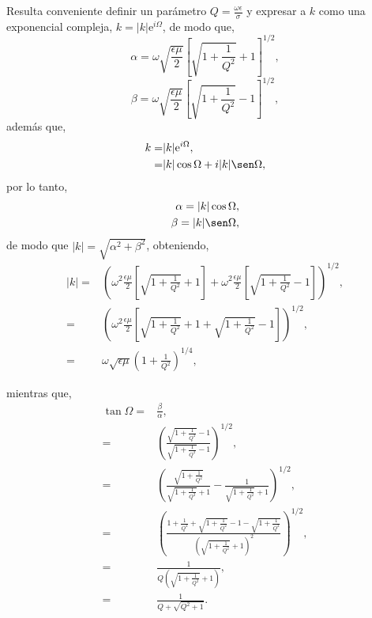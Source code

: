 \documentclass[11pt,fleqn]{book} %
\begin{document}
Resulta conveniente definir un par\'ametro $Q=\frac{\omega\epsilon}{\sigma}$ y expresar a $k$ como una exponencial compleja, $k=|k|\text{e}^{i\Omega}$, de modo que,
\begin{equation}
\alpha=\omega\sqrt{\frac{\epsilon\mu}{2}}\left[ \sqrt{1+\frac{1}{Q^2}}+1 \right]^{1/2},
\end{equation}
 \begin{equation}
 \beta=\omega\sqrt{\frac{\epsilon\mu}{2}}\left[ \sqrt{1+\frac{1}{Q^2}}-1 \right]^{1/2},
 \end{equation}
adem\'as que,
\begin{equation*}
\begin{split}
k=&|k|\text{e}^{i\Omega},\\
=&|k|\cos \Omega+i|k|\sen \Omega,
\end{split}
\end{equation*}
por lo tanto,
\begin{equation*}
\begin{split}
\alpha=|k|\cos \Omega,\\
\beta=|k|\sen \Omega,
\end{split}
\end{equation*}
de modo que $|k|=\sqrt{\alpha^2+\beta^2}$, obteniendo,
\begin{equation}
\begin{split}
|k|=& \left( \omega^2\frac{\epsilon\mu}{2}\left[ \sqrt{1+\frac{1}{Q^2}}+1 \right]+\omega^2 \frac{\epsilon\mu}{2} \left[ \sqrt{1+\frac{1}{Q^2}}-1 \right] \right)^{1/2},\\
 =&\left( \omega^2 \frac{\epsilon\mu}{2} \left[\sqrt{1+\frac{1}{Q^2}}+1 +\sqrt{1+\frac{1}{Q^2}}-1\right] \right)^{1/2} ,\\
=& \omega \sqrt{\epsilon\mu} (1+\frac{1}{Q^2})^{1/4},
\end{split}
\end{equation}

mientras que,
\begin{equation}
\begin{split}
\tan \Omega=&\frac{\beta}{\alpha},\\
=&\left( \frac{\sqrt{1+\frac{1}{Q^2}}-1}{\sqrt{1+\frac{1}{Q^2}}-1} \right)^{1/2},\\
=& \left( \frac{\sqrt{1+\frac{1}{Q^2}}}{\sqrt{1+\frac{1}{Q^2}}+1} - \frac{1}{\sqrt{1+\frac{1}{Q^2}}+1}\right)^{1/2},\\
=& \left( \frac{ 1+\frac{1}{Q^2}+ \sqrt{1+\frac{1}{Q^2}}-1-\sqrt{1+\frac{1}{Q^2}} }{\left( \sqrt{1+\frac{1}{Q^2}}+1\right)^2}  \right)^{1/2},\\
=&  \frac{1}{Q \left(\sqrt{1+\frac{1}{Q^2}}+1 \right) },\\
=&  \frac{1}{Q+\sqrt{Q^2+1}}.
\end{split}
\end{equation}
\end{document}
